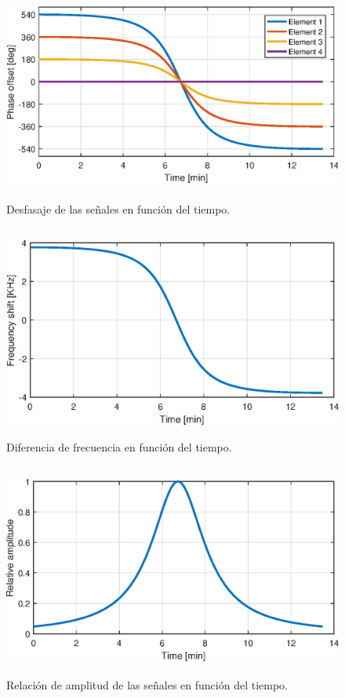 \documentclass{article}
\newenvironment{standalone}{\begin{preview}}{\end{preview}}
\begin{document}
\begin{standalone}
  \begin{figure}[!htbp]
    \centering
    \includegraphics[width=\linewidth, height=70mm, keepaspectratio]{../images/t-phase-offset.eps}
    \caption{Desfasaje de las señales en función del tiempo.}
    \label{fig:t-phase-offset}
  \end{figure}

  \begin{figure}[!htbp]
    \centering
    \includegraphics[width=\linewidth, height=70mm, keepaspectratio]{../images/t-frequency-shift.eps}
    \caption{Diferencia de frecuencia en función del tiempo.}
    \label{fig:t-frequency-shift}
  \end{figure}

  \begin{figure}[!htbp]
    \centering
    \includegraphics[width=\linewidth, height=70mm, keepaspectratio]{../images/t-relative-amplitude.eps}
    \caption{Relación de amplitud de las señales en función del tiempo.}
    \label{fig:t-relative-amplitude}
  \end{figure}




\end{standalone}
\end{document}
